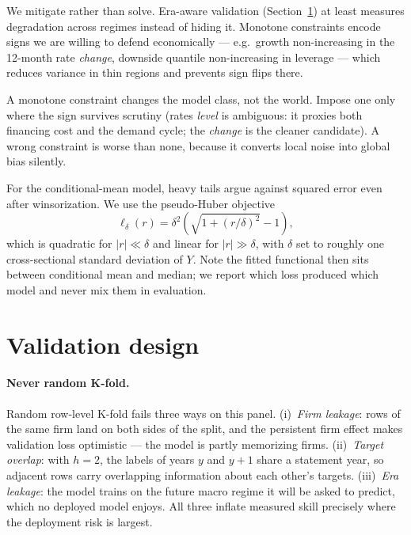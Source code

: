 We mitigate rather than solve. Era-aware validation (Section~\ref{sec:xgb-validation})
at least measures degradation across regimes instead of hiding it. Monotone constraints
encode signs we are willing to defend economically --- e.g.\ growth non-increasing in the
12-month rate \emph{change}, downside quantile non-increasing in leverage --- which
reduces variance in thin regions and prevents sign flips there.

\begin{remark}
\label{rem:xgb-mono}
A monotone constraint changes the model class, not the world. Impose one only where the
sign survives scrutiny (rates \emph{level} is ambiguous: it proxies both financing cost
and the demand cycle; the \emph{change} is the cleaner candidate). A wrong constraint is
worse than none, because it converts local noise into global bias silently.
\end{remark}

For the conditional-mean model, heavy tails argue against squared error even after
winsorization. We use the pseudo-Huber objective
\begin{equation}
\ell_\delta(r) = \delta^2\left(\sqrt{1 + (r/\delta)^2} - 1\right),
\label{eq:xgb-phuber}
\end{equation}
which is quadratic for $|r| \ll \delta$ and linear for $|r| \gg \delta$, with $\delta$
set to roughly one cross-sectional standard deviation of $Y$. Note the fitted functional
then sits between conditional mean and median; we report which loss produced which model
and never mix them in evaluation.

\section{Validation design}
\label{sec:xgb-validation}

\paragraph{Never random K-fold.}
Random row-level K-fold fails three ways on this panel. (i)~\emph{Firm leakage}: rows of
the same firm land on both sides of the split, and the persistent firm effect makes
validation loss optimistic --- the model is partly memorizing firms. (ii)~\emph{Target
overlap}: with $h=2$, the labels of years $y$ and $y+1$ share a statement year, so
adjacent rows carry overlapping information about each other's targets.
(iii)~\emph{Era leakage}: the model trains on the future macro regime it will be asked to
predict, which no deployed model enjoys. All three inflate measured skill precisely where
the deployment risk is largest.

